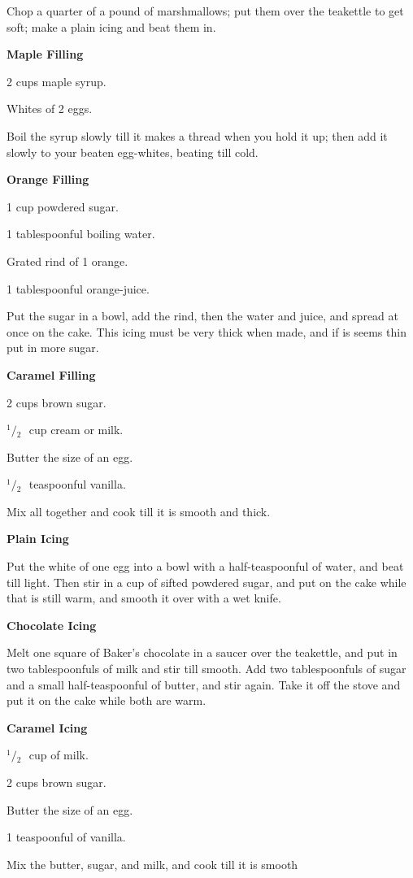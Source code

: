 \documentclass[11pt]{book}
\newcommand{\indpar}{\par\noindent\hspace*{\parindent}}
\newcommand{\ingredient}{\indpar}
\newcommand{\instruction}{\indpar}
\newcommand{\OneHalf}{\ensuremath{{}^1\!\!/\!{}_2\mbox{\ }}}
\newenvironment{RecipeTitle}{\medskip\begin{center}\large\bf }{\end{center}\smallskip}
\begin{document}
\instruction  Chop a quarter of a pound of marshmallows; put them over the
teakettle to get soft; make a plain icing and beat them in.
\begin{RecipeTitle}
Maple Filling\label{maple_filling}
\end{RecipeTitle}
\ingredient  2 cups maple syrup.
\ingredient  Whites of 2 eggs.
\instruction  Boil the syrup slowly till it makes a thread when you hold
it up; then add it slowly to your beaten egg-whites, beating
till cold.
\begin{RecipeTitle}
Orange Filling\label{orange_filling}
\end{RecipeTitle}
\ingredient  1 cup powdered sugar.
\ingredient  1 tablespoonful boiling water.
\ingredient  Grated rind of 1 orange.
\ingredient  1 tablespoonful orange-juice.
\instruction  Put the sugar in a bowl, add the rind, then the water and
juice, and spread at once on the cake.  This icing must be
very thick when made, and if is seems thin put in more sugar.
\begin{RecipeTitle}
Caramel Filling\label{caramel_filling}
\end{RecipeTitle}
\ingredient  2 cups brown sugar.
\ingredient  \OneHalf cup cream or milk.
\ingredient  Butter the size of an egg.
\ingredient  \OneHalf teaspoonful vanilla.
\instruction  Mix all together and cook till it is smooth and thick.
\begin{RecipeTitle}
Plain Icing\label{plain_icing}
\end{RecipeTitle}
\instruction  Put the white of one egg into a bowl with a half-teaspoonful
of water, and beat till light.  Then stir in a cup of sifted
powdered sugar, and put on the cake while that is still warm,
and smooth it over with a wet knife.
\begin{RecipeTitle}
Chocolate Icing\label{chocolate_icing}
\end{RecipeTitle}
\instruction  Melt one square of Baker's chocolate in a saucer over the
teakettle, and put in two tablespoonfuls of milk and stir till
smooth.  Add two tablespoonfuls of sugar and a small
half-teaspoonful of butter, and stir again.  Take it off the
stove and put it on the cake while both are warm.
\begin{RecipeTitle}
Caramel Icing\label{caramel_icing}
\end{RecipeTitle}
\ingredient  \OneHalf cup of milk.
\ingredient  2 cups brown sugar.
\ingredient  Butter the size of an egg.
\ingredient  1 teaspoonful of vanilla.
\instruction  Mix the butter, sugar, and milk, and cook till it is smooth
\end{document}
